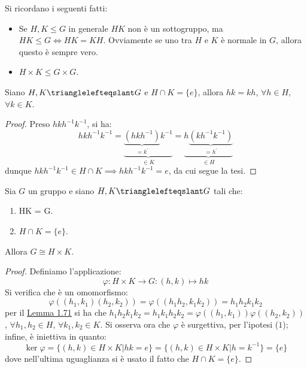 \documentclass[11pt]{scrartcl}
\begin{document}
\begin{remark}
    Si ricordano i seguenti fatti:
    \begin{itemize}
        \item Se $H,K \leqslant G$ in generale $HK$ non è un sottogruppo, ma $HK \leqslant G \iff HK = KH$. Ovviamente se uno tra $H$ e $K$ è normale in $G$, allora questo
        è sempre vero.
        \item $H \times K \leqslant G \times G$.
    \end{itemize}
\end{remark}

\begin{lemma}
    \label{l:1.71}
    Siano $H,K \trianglelefteqslant G$ e $H \cap K = \{e\}$, allora $hk = kh$, $\forall h \in H$, $\forall k \in K$.
\end{lemma}

\begin{proof}
    Preso $hkh^{-1}k^{-1}$, si ha:
        \[ hkh^{-1}k^{-1} = \underbrace{\underbrace{(hkh^{-1})}_{= k^{\prime}}k^{-1}}_{\in K} = \underbrace{h\underbrace{(kh^{-1}k^{-1})}_{= h^{\prime}}}_{\in H}
            \]
    dunque $hkh^{-1}k^{-1} \in H \cap K \implies hkh^{-1}k^{-1} = e$, da cui segue la tesi.
\end{proof}

\begin{theorem}
    \label{t:1.72}
    Sia $G$ un gruppo e siano $H,K \trianglelefteqslant G$ tali che:
        \begin{enumerate}[(1)]
            \item HK = G.
            \item $H \cap K = \{e\}$.
        \end{enumerate}
    Allora $G \cong H \times K$.
\end{theorem}

\begin{proof}
    Definiamo l'applicazione:
        \[ \varphi : H \times K \longrightarrow G : (h,k) \mapsto hk
            \]
    Si verifica che è un omomorfismo:
        \[\varphi((h_1,k_1)(h_2,k_2)) = \varphi((h_1h_2,k_1k_2)) = h_1h_2k_1k_2
            \]
    per il \hyperref[l:1.71]{Lemma 1.71} si ha che $h_1h_2k_1k_2 = h_1k_1h_2k_2 = \varphi((h_1,k_1))\varphi((h_2,k_2))$, $\forall h_1,h_2 \in H$, $\forall k_1,k_2 \in K$.
    Si osserva ora che $\varphi$ è surgettiva, per l'ipotesi ($1$); infine, è iniettiva in quanto:
        \[ \ker \varphi = \{(h,k) \in H \times K | hk = e\} = \{(h,k) \in H \times K | h = k^{-1}\} = \{e\}
            \]
    dove nell'ultima uguaglianza si è usato il fatto che $H \cap K = \{e\}$.
\end{proof}
\end{document}
